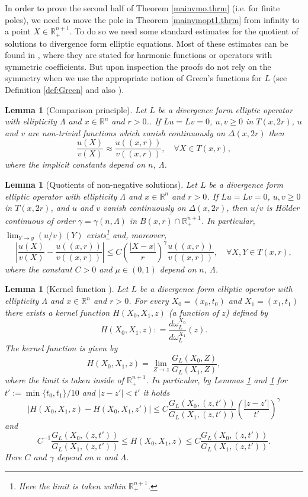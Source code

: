 \documentclass[11pt, a4paper,leqno]{amsart}
\theoremstyle{plain}
\newtheorem{lemma}[equation]{Lemma}
\theoremstyle{definition}
\theoremstyle{remark}
\numberwithin{equation}{section}
\newcommand{\rn}{\mathbb{R}^n}
\newcommand{\ree}{\mathbb{R}^{n+1}}
\newcommand{\hm}{\omega}
\begin{document}
In order to prove the second half of Theorem \ref{mainvmo.thrm} (i.e. for finite poles), we need to move the pole in Theorem \ref{mainvmopt1.thrm} from infinity to a point $X \in \ree_+$. To do so we need some standard estimates for the quotient of solutions to divergence form elliptic equations. Most of these estimates can be found in \cite{JKNTA, KenigCBMS}, where they are stated for harmonic functions or operators with symmetric coefficients. But upon inspection the proofs do not rely on the symmetry when we use the appropriate notion of Green's functions for $L $ (see Definition \ref{def:Green} and also \cite{HMTbook}). 

\begin{lemma}[Comparison principle]\label{comparisonprinc.lem}
Let $L$ be a divergence form elliptic operator with ellipticity $\Lambda$ and $x \in \rn$ and $r > 0$.. If $Lu =Lv = 0$, $u, v \ge 0$ in $T(x,2r)$, $u$ and $v$ are non-trivial functions which vanish continuously on $\Delta(x, 2r)$ then
\[ 
\frac{u(X)}{v(X)} \approx \frac{u((x,r))}{v((x,r))}, \quad \forall X \in T(x,r),
\]
where the implicit constants depend on $n$, $\Lambda$.

\end{lemma}

\begin{lemma}[Quotients of non-negative solutions]\label{QHC.lem}
Let $L$ be a divergence form elliptic operator with ellipticity $\Lambda$ and $x \in \rn$ and $r > 0$. If $Lu =Lv = 0$, $u, v \ge 0$ in $T(x,2r)$, and $u$ and $v$ vanish continuously on $\Delta(x, 2r)$, then $u/v$ is H\"older continuous of order $\gamma = \gamma(n, \Lambda)$ in $\overline{B(x,r) \cap \ree_+}$. In particular, $\lim_{Y \to y} (u/v)(Y)$ exists\footnote{Here the limit is taken within $\ree_+$.} and, moreover,
\begin{equation}\label{QHC.eq}
\left| \frac{u(X)}{v(X)} -  \frac{u((x,r))}{v((x,r))} \right| \le C\left(\frac{|X - x|}{r}\right)^\gamma \frac{u((x,r))}{v((x,r))}, \quad \forall X, Y \in T(x,r),
\end{equation}
where the constant $C >0$ and $\mu \in (0,1)$ depend on $n$, $\Lambda$.
\end{lemma}


\begin{lemma}[Kernel function {\cite{KenigCBMS}}]\label{Kernelcomparehc.lem}
Let $L$ be a divergence form elliptic operator with ellipticity $\Lambda$ and $x \in \rn$ and $r > 0$. For every $X_0 = (x_0, t_0)$ and $X_1 = (x_1, t_1)$ there exists a kernel function $H(X_0,X_1, z)$ (a function of $z$) defined by
\[H(X_0,X_1, z) : = \frac{d\hm_L^{X_0}}{d\hm_L^{X_1}}(z).\]
The kernel function is given by 
\[H(X_0,X_1, z)  = \lim_{Z \to z} \frac{G_L(X_0,Z)}{G_L(X_1,Z)},\]
where the limit is taken inside of $\ree_+$. In particular, by Lemmas \ref{comparisonprinc.lem} and \ref{QHC.lem} for $t' := \min\{t_0,t_1\}/10$ and $|z - z'| < t'$ it holds 
\[|H(X_0,X_1, z) - H(X_0,X_1, z')| \le C\frac{G_L(X_0, (z, t')) }{G_L(X_1, (z, t'))}\left(\frac{|z - z'|}{t'} \right)^\gamma\]
and 
\[C^{-1}\frac{G_L(X_0, (z, t')) }{G_L(X_1, (z, t'))} \le H(X_0,X_1, z) \le C\frac{G_L(X_0, (z, t')) }{G_L(X_1, (z, t'))}  .\]
Here $C$ and $\gamma$ depend on $n$ and $\Lambda$.
\end{lemma}
\end{document}
